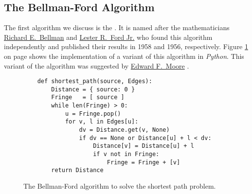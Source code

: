 \subsection{The Bellman-Ford Algorithm}
The first algorithm we discuss is the
\href{https://en.wikipedia.org/wiki/Bellman-Ford_algorithm}{}.
It is named after the mathematicians 
\href{https://en.wikipedia.org/wiki/Richard_E._Bellman}{Richard E.~Bellman} \cite{bellman:58} and 
\href{https://en.wikipedia.org/wiki/L._R._Ford_Jr.}{Lester R.~Ford Jr.} \cite{ford:56} who found this algorithm
independently and published their results in 1958 and 1956, respectively.  Figure
\ref{fig:Moore.ipynb} on page \pageref{fig:Moore.ipynb} shows the implementation of a variant of this 
algorithm in \textsl{Python}.  This variant of the algorithm was suggested by 
\href{https://en.wikipedia.org/wiki/Edward_F._Moore}{Edward F.~Moore} \cite{moore:59}.

\begin{figure}[!ht]
  \centering
\begin{verbatim}
    def shortest_path(source, Edges):
        Distance = { source: 0 }
        Fringe   = [ source ]
        while len(Fringe) > 0:
            u = Fringe.pop()
            for v, l in Edges[u]:
                dv = Distance.get(v, None)
                if dv == None or Distance[u] + l < dv:
                    Distance[v] = Distance[u] + l
                    if v not in Fringe: 
                        Fringe = Fringe + [v] 
        return Distance
\end{verbatim}
\vspace*{-0.3cm}
  \caption{The Bellman-Ford algorithm to solve the shortest path problem.}
  \label{fig:Moore.ipynb}
\end{figure} 

